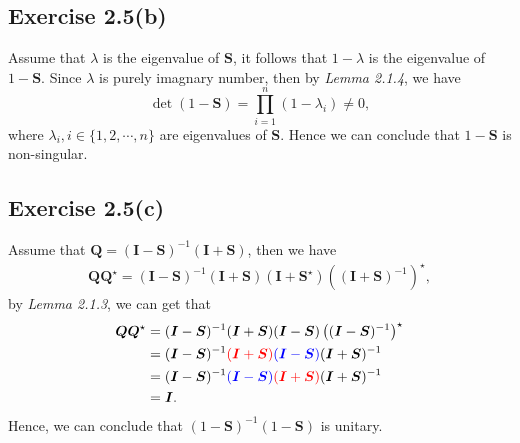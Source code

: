 \documentclass{article}
\begin{document}
\subsection{Exercise 2.5(b)}
    Assume that $\lambda$ is the eigenvalue of $\bm{S}$, it follows that $1- \lambda$ is the eigenvalue of $1 - \bm{S}$. Since $\lambda$ is purely imagnary number, then by \textit{Lemma 2.1.4}, we have
    $$
    \det{(1-\bm{S})}  = \prod_{i=1}^{n} (1 - \lambda_i) \neq 0,
    $$
    where $\lambda_i, i \in \{1, 2, \cdots, n\}$ are eigenvalues of $\bm{S}$. Hence we can conclude that $1-\bm{S}$ is non-singular. 
    
\subsection{Exercise 2.5(c)}
        Assume that $\bm{Q} = (\bm{I} - \bm{S})^{-1}(\bm{I} + \bm{S})$, then we have
        $$
        \begin{aligned}
        \bm{Q}\bm{Q}^{\star} = (\bm{I}-\bm{S})^{-1} (\bm{I} + \bm{S}) (\bm{I} + \bm{S}^{\star})\left((\bm{I} + \bm{S})^{-1}\right)^{\star},
        \end{aligned}
        $$
        by \textit{Lemma 2.1.3}, we can get that
        $$
        \begin{aligned}
        \bm{Q}\bm{Q}^{\star} &= (\bm{I}-\bm{S})^{-1} (\bm{I} + \bm{S}) (\bm{I} - \bm{S})\left((\bm{I} - \bm{S})^{-1}\right)^{\star}\\
        &= (\bm{I}-\bm{S})^{-1} \textcolor{red}{(\bm{I} + \bm{S})}\textcolor{blue}{(\bm{I} - \bm{S})} (\bm{I} + \bm{S})^{-1} \\
        &= (\bm{I}-\bm{S})^{-1} \textcolor{blue}{(\bm{I} - \bm{S})}\textcolor{red}{(\bm{I} + \bm{S})} (\bm{I} + \bm{S})^{-1} \\
        &= \bm{I}.
        \end{aligned} 
        $$
        Hence, we can conclude that $(1-\bm{S})^{-1}(1-\bm{S})$ is unitary.
    
\end{document}
